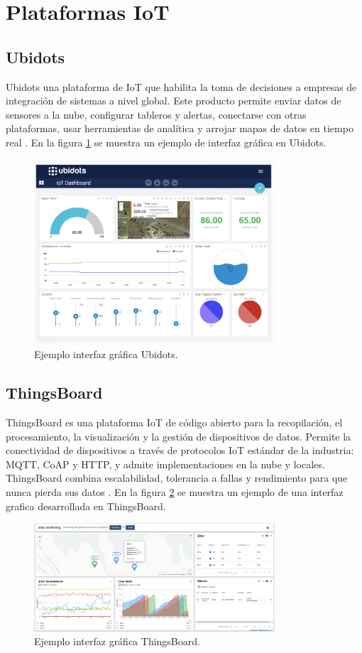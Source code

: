 \section{Plataformas IoT}
\subsection{Ubidots}
Ubidots una plataforma de IoT que habilita la toma de decisiones a empresas de integración de sistemas a nivel global. Este producto permite enviar datos de sensores a la nube, configurar tableros y alertas, conectarse con otras plataformas, usar herramientas de analítica y arrojar mapas de datos en tiempo real \citep{InterfazIoTUbidots}. En la figura \ref{fig:InterfazUBIDOTS} se muestra un ejemplo de interfaz gráfica en Ubidots.

\begin{figure}[htbp]
	\centering
	\includegraphics[width=0.8\textwidth]{./Figures/ubidots.png}
	\caption{Ejemplo interfaz gráfica Ubidots.}
	\label{fig:InterfazUBIDOTS}
\end{figure}
\subsection{ThingsBoard}
ThingsBoard es una plataforma IoT de código abierto para la recopilación, el procesamiento, la visualización y la gestión de dispositivos de datos.
Permite la conectividad de dispositivos a través de protocolos IoT estándar de la industria: MQTT, CoAP y HTTP, y admite implementaciones en la nube y locales. ThingsBoard combina escalabilidad, tolerancia a fallas y rendimiento para que nunca pierda sus datos \citep{THINGSBOARD}. En la figura \ref{fig:InterfazThingsBoard} se muestra un ejemplo de una interfaz grafica desarrollada en ThingsBoard. 
\begin{figure}[htbp]
	\centering
	\includegraphics[width=0.8\textwidth]{./Figures/thingsboard.png}
	\caption{Ejemplo interfaz gráfica ThingsBoard.}
	\label{fig:InterfazThingsBoard}
\end{figure}